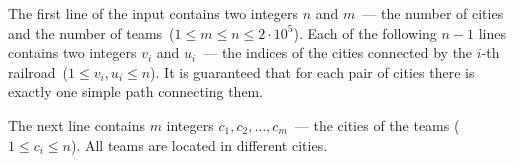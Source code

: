 The first line of the input contains two integers $n$ and $m$~--- the number of cities and the number of teams~($1 \le m \le n \le 2 \cdot 10^5$). Each of the following $n - 1$ lines contains two integers $v_i$ and $u_i$~--- the indices of the cities connected by the $i$-th railroad~($1 \le v_i, u_i \le n$). It is guaranteed that for each pair of cities there is exactly one simple path connecting them.


The next line contains $m$ integers $c_1, c_2, \ldots, c_m$~--- the cities of the teams ($1 \le c_i \le n$). All teams are located in different cities.